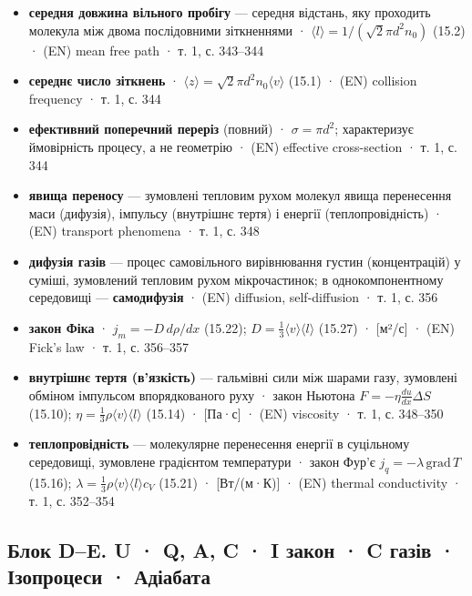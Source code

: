 \documentclass[11pt,a4paper,oneside]{book}
\newcommand{\book}{}
\begin{document}
\begin{itemize}
\item \textbf{середня довжина вільного пробігу} — середня відстань, яку проходить молекула між двома послідовними зіткненнями · $\langle l\rangle = 1/(\sqrt2\pi d^2n_0)$ (15.2) · (EN) mean free path · \book{} т. 1, с. 343–344
\item \textbf{середнє число зіткнень} · $\langle z\rangle = \sqrt2\pi d^2n_0\langle v\rangle$ (15.1) · (EN) collision frequency · \book{} т. 1, с. 344
\item \textbf{ефективний поперечний переріз} (повний) · $\sigma = \pi d^2$; характеризує ймовірність процесу, а не геометрію · (EN) effective cross-section · \book{} т. 1, с. 344
\item \textbf{явища переносу} — зумовлені тепловим рухом молекул явища перенесення маси (дифузія), імпульсу (внутрішнє тертя) і енергії (теплопровідність) · (EN) transport phenomena · \book{} т. 1, с. 348
\item \textbf{дифузія газів} — процес самовільного вирівнювання густин (концентрацій) у суміші, зумовлений тепловим рухом мікрочастинок; в однокомпонентному середовищі — \textbf{самодифузія} · (EN) diffusion, self-diffusion · \book{} т. 1, с. 356
\item \textbf{закон Фіка} · $j_m = -D\,d\rho/dx$ (15.22); $D = \tfrac13\langle v\rangle\langle l\rangle$ (15.27) · [м²/с] · (EN) Fick's law · \book{} т. 1, с. 356–357
\item \textbf{внутрішнє тертя (в'язкість)} — гальмівні сили між шарами газу, зумовлені обміном імпульсом впорядкованого руху · закон Ньютона $F = -\eta\frac{du}{dx}\Delta S$ (15.10); $\eta = \tfrac13\rho\langle v\rangle\langle l\rangle$ (15.14) · [Па·с] · (EN) viscosity · \book{} т. 1, с. 348–350
\item \textbf{теплопровідність} — молекулярне перенесення енергії в суцільному середовищі, зумовлене градієнтом температури · закон Фур'є $j_q = -\lambda\,\text{grad}\,T$ (15.16); $\lambda = \tfrac13\rho\langle v\rangle\langle l\rangle c_V$ (15.21) · [Вт/(м·К)] · (EN) thermal conductivity · \book{} т. 1, с. 352–354
\end{itemize}

\subsection*{Блок D–E. U · Q, A, C · I закон · C газів · Ізопроцеси · Адіабата}
\end{document}
